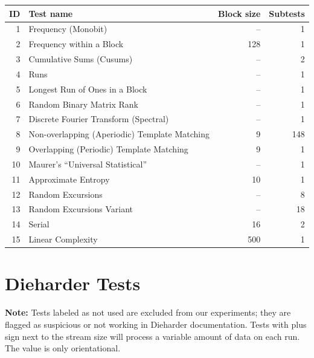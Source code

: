 \documentclass[
	digital,    %
	oneside,    %
	color,
	11pt,
	nocover,
	notable,
	nolof,
	nolot,
]{fithesis3}
\theoremstyle{definition}
\theoremstyle{remark}
\begin{document}
\begin{nomar}
\centering
\begin{tabular}{@{}rlrr@{}} \toprule
\textbf{ID} & \textbf{Test name} & \textbf{Block size} & \textbf{Subtests} \\ \midrule
1  & Frequency (Monobit)                           & --  & 1 \\
2  & Frequency within a Block                      & 128 & 1 \\
3  & Cumulative Sums (Cusums)	                   & --  & 2 \\
4  & Runs                                          & --  & 1 \\
5  & Longest Run of Ones in a Block                & --  & 1 \\
6  & Random Binary Matrix Rank                     & --  & 1 \\
7  & Discrete Fourier Transform (Spectral)         & --  & 1 \\
8  & Non-overlapping (Aperiodic) Template Matching & 9   & 148 \\
9  & Overlapping (Periodic) Template Matching      & 9   & 1 \\
10 & Maurer's “Universal Statistical” 	           & --  & 1 \\
11 & Approximate Entropy 	                       & 10  & 1 \\
12 & Random Excursions 	                           & --  & 8 \\
13 & Random Excursions Variant	                   & --  & 18 \\
14 & Serial                                        & 16  & 2 \\
15 & Linear Complexity	                           & 500 & 1 \\ \bottomrule
\end{tabular}
\end{nomar}

\chapter{Dieharder Tests}
\label{app:dieharder_tests}
\textbf{Note:} Tests labeled as not used are excluded from our experiments; they are flagged as suspicious or not working in Dieharder documentation. Tests with plus sign next to the stream size will process a variable amount of data on each run. The value is only orientational.
\end{document}
